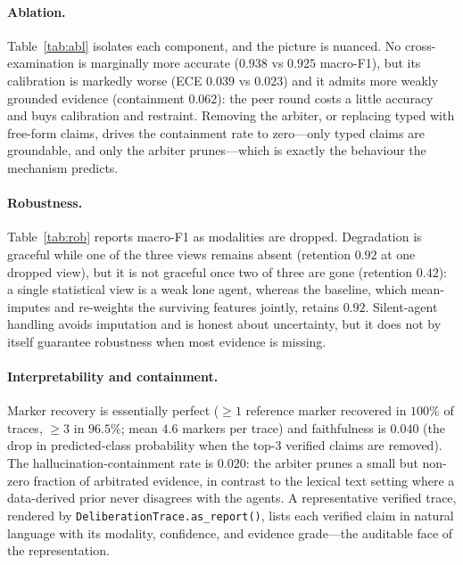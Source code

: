 \documentclass[runningheads]{llncs}
\begin{document}
\paragraph{Ablation.}
Table~\ref{tab:abl} isolates each component, and the picture is nuanced. No cross-examination is marginally more accurate ($0.938$ vs $0.925$ macro-F1), but its calibration is markedly worse (ECE $0.039$ vs $0.023$) and it admits more weakly grounded evidence (containment $0.062$): the peer round costs a little accuracy and buys calibration and restraint. Removing the arbiter, or replacing typed with free-form claims, drives the containment rate to zero---only typed claims are groundable, and only the arbiter prunes---which is exactly the behaviour the mechanism predicts.

\paragraph{Robustness.}
Table~\ref{tab:rob} reports macro-F1 as modalities are dropped. Degradation is graceful while one of the three views remains absent (retention $0.92$ at one dropped view), but it is not graceful once two of three are gone (retention $0.42$): a single statistical view is a weak lone agent, whereas the baseline, which mean-imputes and re-weights the surviving features jointly, retains $0.92$. Silent-agent handling avoids imputation and is honest about uncertainty, but it does not by itself guarantee robustness when most evidence is missing.

\paragraph{Interpretability and containment.}
Marker recovery is essentially perfect ($\geq 1$ reference marker recovered in $100\%$ of traces, $\geq 3$ in $96.5\%$; mean $4.6$ markers per trace) and faithfulness is $0.040$ (the drop in predicted-class probability when the top-3 verified claims are removed). The hallucination-containment rate is $0.020$: the arbiter prunes a small but non-zero fraction of arbitrated evidence, in contrast to the lexical text setting where a data-derived prior never disagrees with the agents. A representative verified trace, rendered by \texttt{DeliberationTrace.as\_report()}, lists each verified claim in natural language with its modality, confidence, and evidence grade---the auditable face of the representation.

\end{document}
